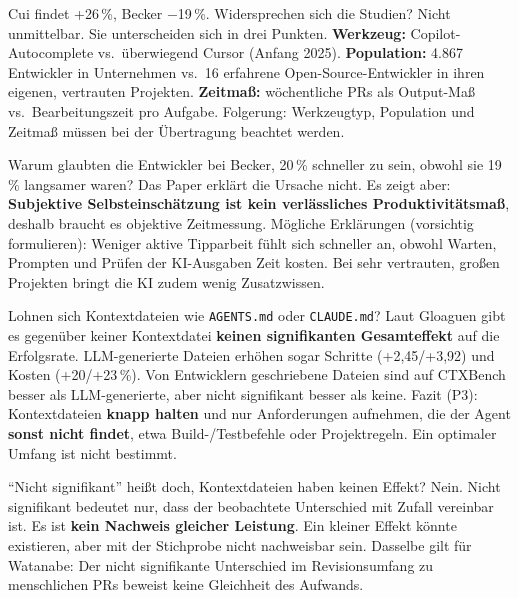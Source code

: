 \documentclass[12pt,a4paper]{article}
\begin{document}
\begin{qa}{Cui findet +26\,\%, Becker $-$19\,\%. Widersprechen sich die Studien?}
Nicht unmittelbar. Sie unterscheiden sich in drei Punkten. \textbf{Werkzeug:} Copilot-Autocomplete vs.\ überwiegend Cursor (Anfang 2025). \textbf{Population:} 4.867 Entwickler in Unternehmen vs.\ 16 erfahrene Open-Source-Entwickler in ihren eigenen, vertrauten Projekten. \textbf{Zeitmaß:} wöchentliche PRs als Output-Maß vs.\ Bearbeitungszeit pro Aufgabe. Folgerung: Werkzeugtyp, Population und Zeitmaß müssen bei der Übertragung beachtet werden.
\end{qa}

\begin{qa}{Warum glaubten die Entwickler bei Becker, 20\,\% schneller zu sein, obwohl sie 19\,\% langsamer waren?}
Das Paper erklärt die Ursache nicht. Es zeigt aber: \textbf{Subjektive Selbsteinschätzung ist kein verlässliches Produktivitätsmaß}, deshalb braucht es objektive Zeitmessung. Mögliche Erklärungen (vorsichtig formulieren): Weniger aktive Tipparbeit fühlt sich schneller an, obwohl Warten, Prompten und Prüfen der KI-Ausgaben Zeit kosten. Bei sehr vertrauten, großen Projekten bringt die KI zudem wenig Zusatzwissen.
\end{qa}

\begin{qa}{Lohnen sich Kontextdateien wie \texttt{AGENTS.md} oder \texttt{CLAUDE.md}?}
Laut Gloaguen gibt es gegenüber keiner Kontextdatei \textbf{keinen signifikanten Gesamteffekt} auf die Erfolgsrate. LLM-generierte Dateien erhöhen sogar Schritte (+2,45/+3,92) und Kosten (+20/+23\,\%). Von Entwicklern geschriebene Dateien sind auf CTXBench besser als LLM-generierte, aber nicht signifikant besser als keine. Fazit (P3): Kontextdateien \textbf{knapp halten} und nur Anforderungen aufnehmen, die der Agent \textbf{sonst nicht findet}, etwa Build-/Testbefehle oder Projektregeln. Ein optimaler Umfang ist nicht bestimmt.
\end{qa}

\begin{qa}{\enquote{Nicht signifikant} heißt doch, Kontextdateien haben keinen Effekt?}
Nein. Nicht signifikant bedeutet nur, dass der beobachtete Unterschied mit Zufall vereinbar ist. Es ist \textbf{kein Nachweis gleicher Leistung}. Ein kleiner Effekt könnte existieren, aber mit der Stichprobe nicht nachweisbar sein. Dasselbe gilt für Watanabe: Der nicht signifikante Unterschied im Revisionsumfang zu menschlichen PRs beweist keine Gleichheit des Aufwands.
\end{qa}
\end{document}
